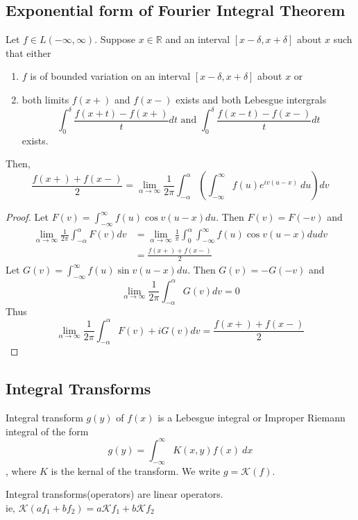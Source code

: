 \subsection{Exponential form of Fourier Integral Theorem}
	Let \( f \in L(-\infty,\infty) \).
	Suppose \( x \in \mathbb{R} \) and an interval $[x-\delta,x+\delta]$ about $x$ such that either 
	\begin{enumerate}
		\item $f$ is of bounded variation on an interval $[x-\delta,x+\delta]$ about $x$ or
		\item both limits $f(x+)$ and $f(x-)$ exists and both Lebesgue intergrals
			\[ \int_0^\delta \frac{f(x+t)-f(x+)}{t} dt \text{ and }\int_0^\delta \frac{f(x-t)-f(x-)}{t} dt \]
			exists.
	\end{enumerate}
	Then, 
	\[ \frac{f(x+)+f(x-)}{2} = \lim_{\alpha \to \infty} \frac{1}{2\pi} \int_{-\alpha}^\alpha \left( \int_{-\infty}^\infty f(u) e^{iv(u-x)}\ du\right) dv \]
	\begin{proof}
		Let \( F(v) = \int_{-\infty}^\infty f(u) \cos v(u-x) du \).
		Then \( F(v) = F(-v) \) and 
		\begin{align*}
			\lim_{\alpha \to \infty} \frac{1}{2\pi} \int_{-\alpha}^\alpha F(v) dv
			& = \lim_{\alpha \to \infty} \frac{1}{\pi} \int_0^\alpha \int_{-\infty}^\infty f(u) \cos v(u-x) du dv\\
			& = \frac{f(x+)+f(x-)}{2}
		\end{align*}
		Let \( G(v) = \int_{-\infty}^\infty f(u) \sin v(u-x) du \).
		Then \( G(v) = -G(-v) \) and
		\[ \lim_{\alpha \to \infty} \frac{1}{2\pi} \int_{-\alpha}^\alpha G(v) dv = 0 \]
		Thus 
		\[ \lim_{\alpha \to \infty} \frac{1}{2\pi} \int_{-\alpha}^\alpha F(v) + iG(v) dv = \frac{f(x+)+f(x-)}{2} \]
	\end{proof}

\subsection{Integral Transforms}
\begin{definition}
	Integral transform $g(y)$ of $f(x)$ is a Lebesgue integral or Improper Riemann integral of the form
	\[ g(y) = \int_{-\infty}^\infty K(x,y) f(x)\ dx \], where $K$ is the kernal of the transform.
	We write \( g = \mathscr{K}(f) \).
\end{definition}

\begin{remark}
	Integral transforms(operators) are linear operators.\\
	 ie, \( \mathscr{K}(af_1 + bf_2) = a\mathscr{K}f_1 + b\mathscr{K}f_2 \)
\end{remark}

